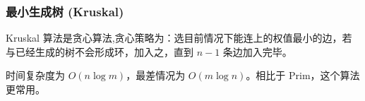 \subsubsection{最小生成树 (Kruskal)}
	Kruskal 算法是贪心算法,贪心策略为：选目前情况下能连上的权值最小的边，若与已经生成的树不会形成环，加入之，直到 $n-1$ 条边加入完毕。
	
	时间复杂度为 $O(n\log m)$，最差情况为 $O(m\log n)$。相比于 Prim，这个算法更常用。
	
	